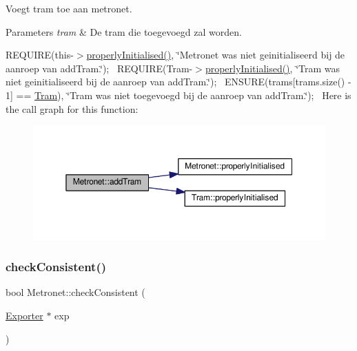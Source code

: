 Voegt tram toe aan metronet. 


\begin{DoxyParams}{Parameters}
{\em tram} & De tram die toegevoegd zal worden.\\
\hline
\end{DoxyParams}
R\+E\+Q\+U\+I\+RE(this-\/$>$\hyperlink{class_metronet_a3d2adce29a947f162924279b766de645}{properly\+Initialised()}, \char`\"{}\+Metronet was niet geinitialiseerd bij de aanroep van add\+Tram.\char`\"{});~\newline
R\+E\+Q\+U\+I\+RE(Tram-\/$>$\hyperlink{class_metronet_a3d2adce29a947f162924279b766de645}{properly\+Initialised()}, \char`\"{}\+Tram was niet geinitialiseerd bij de aanroep van add\+Tram.\char`\"{});~\newline
E\+N\+S\+U\+RE(trams\mbox{[}trams.\+size() -\/ 1\mbox{]} == \hyperlink{class_tram}{Tram}), \char`\"{}\+Tram was niet toegevoegd bij de aanroep van add\+Tram.\char`\"{});~\newline
Here is the call graph for this function\+:
\nopagebreak
\begin{figure}[H]
\begin{center}
\leavevmode
\includegraphics[width=350pt]{class_metronet_a3a01132772f4a367d83af40a3c02e224_cgraph}
\end{center}
\end{figure}
\mbox{\label{class_metronet_a0128de167ec0a36e70abd57170b3faed}} 
\subsubsection{\texorpdfstring{check\+Consistent()}{checkConsistent()}}
{\footnotesize\ttfamily bool Metronet\+::check\+Consistent (\begin{DoxyParamCaption}\item[{\hyperlink{class_exporter}{Exporter} $\ast$}]{exp }\end{DoxyParamCaption})}



